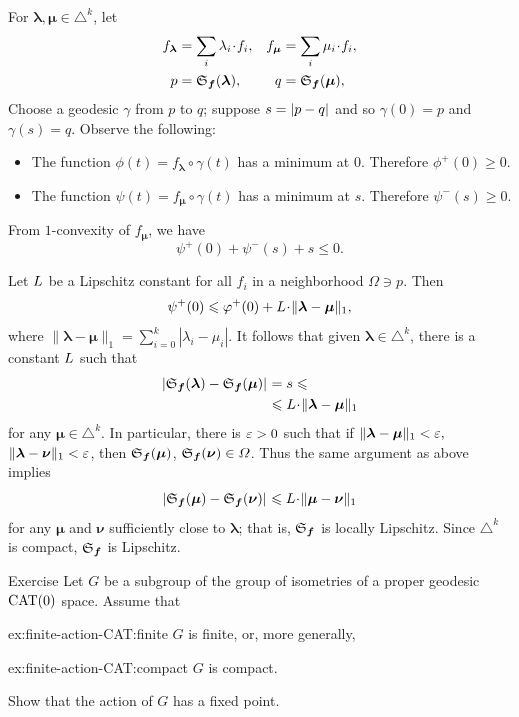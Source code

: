 For $\bm{\lambda},\bm{\mu}\in\triangle^k$,
let 
\begin{align*}
f_{\bm{\lambda}}
&=\sum_i \lambda_i\cdot f_i,
&
f_{\bm{\mu}}
&=\sum_i \mu_i\cdot f_i,
\\
p
&=\spx{\bm{f}}(\bm{\lambda}),
&
q
&=\spx{\bm{f}}(\bm{\mu}),
\end{align*}
Choose a geodesic $\gamma$ from $p$ to $q$;
suppose $s=\dist{p}{q}{}$ and so $\gamma(0)=p$ and $\gamma(s)=q$.
Observe the following:
\begin{itemize}
\item The function $\phi(t)=f_{\bm{\lambda}}\circ\gamma(t)$ has a minimum at $0$.
Therefore $\phi^+(0)\ge 0$.

\item The function $\psi(t)=f_{\bm{\mu}}\circ\gamma(t)$ has a minimum at $s$.
Therefore $\psi^-(s)\ge 0$.
\end{itemize}
From $1$-convexity of $f_{\bm{\mu}}$, we have
\[\psi^+(0)+\psi^-(s)+s\le0.\]

Let $L$ be a Lipschitz constant for all $f_i$ in a neighborhood $\Omega\ni p$.
Then 
\[\psi^+(0)
\le 
\phi^+(0)+\Lip\cdot\|\bm{\lambda}-\bm{\mu}\|_1,\]
where $\|\bm{\lambda}-\bm{\mu}\|_1=\sum_{i=0}^k|\lambda_i-\mu_i|$.
It follows that given $\bm{\lambda}\in\triangle^k$, there is a constant $L$ such that
\begin{align*}
\dist{\spx{\bm{f}}(\bm{\lambda})}{\spx{\bm{f}}(\bm{\mu})}{}
&=
s
\le
\\
&\le 
\Lip\cdot\|\bm{\lambda}-\bm{\mu}\|_1
\end{align*}
for any $\bm{\mu}\in\triangle^k$.
In particular, there is $\varepsilon>0$ such that if $\|\bm{\lambda}-\bm{\mu}\|_1<\varepsilon,$ $\|\bm{\lambda}-\bm{\nu}\|_1 <\varepsilon$, then $\mathfrak{S}_{\bm{f}}(\bm{\mu})$, $\mathfrak{S}_{\bm{f}}(\bm{\nu})\in\varOmega$.
Thus the same argument as above implies 
\[\dist{\spx{\bm{f}}(\bm{\mu})}{\spx{\bm{f}}(\bm{\nu})}{}
\le \Lip\cdot\|\bm{\mu}-\bm{\nu}\|_1\]
for any $\bm{\mu}$ and $\bm{\nu}$ sufficiently close to $\bm{\lambda}$; that is, $\mathfrak{S}_{\bm{f}}$ is locally Lipschitz.
Since $\triangle^k$ is compact, $\mathfrak{S}_{\bm{f}}$ is Lipschitz.
\qeds

\begin{thm}{Exercise}\label{ex:finite-action-CAT}
Let $G$ be a subgroup of the group of isometries of a proper geodesic $\mathrm{CAT}(0)$ space.
Assume that
\begin{subthm}{ex:finite-action-CAT:finite}
$G$ is finite, or, more generally, 
\end{subthm}
\begin{subthm}{ex:finite-action-CAT:compact}
 $G$ is compact.
\end{subthm}
Show that the action of $G$ has a fixed point.
\end{thm}

